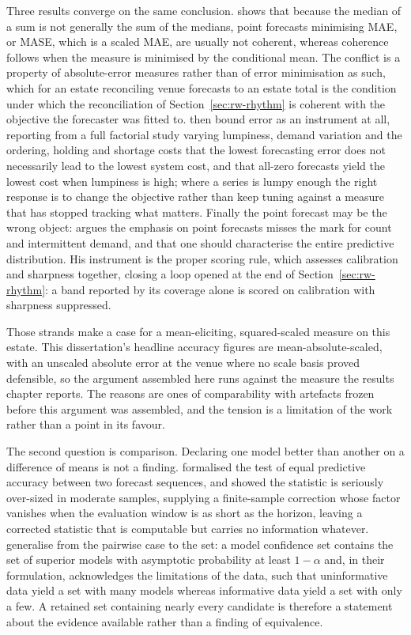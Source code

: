 Three results converge on the same conclusion. \citet{kolassa_we_2023} shows that
because the median of a sum is not generally the sum of the medians, point
forecasts minimising MAE, or MASE, which is a scaled MAE, are usually not
coherent, whereas coherence follows when the measure is minimised by the
conditional mean. The conflict is a property of absolute-error measures rather
than of error minimisation as such, which for an estate reconciling venue
forecasts to an estate total is the condition under which the reconciliation of
Section~\ref{sec:rw-rhythm} is coherent with the objective the forecaster was
fitted to. \citet{chatfield_all-zero_2007} then bound error as an instrument at
all, reporting from a full factorial study varying lumpiness, demand variation
and the ordering, holding and shortage costs that the lowest forecasting error
does not necessarily lead to the lowest system cost, and that all-zero forecasts
yield the lowest cost when lumpiness is high; where a series is lumpy enough the
right response is to change the objective rather than keep tuning against a
measure that has stopped tracking what matters. Finally the point forecast may be
the wrong object: \citet{kolassa_evaluating_2016} argues the emphasis on point
forecasts misses the mark for count and intermittent demand, and that one should
characterise the entire predictive distribution. His instrument is the proper
scoring rule, which assesses calibration and sharpness together, closing a loop
opened at the end of Section~\ref{sec:rw-rhythm}: a band reported by its coverage
alone is scored on calibration with sharpness suppressed.

Those strands make a case for a mean-eliciting, squared-scaled measure on this
estate. This dissertation's headline accuracy figures are mean-absolute-scaled,
with an unscaled absolute error at the venue where no scale basis proved
defensible, so the argument assembled here runs against the measure the results
chapter reports. The reasons are ones of comparability with artefacts frozen
before this argument was assembled, and the tension is a limitation of the work
rather than a point in its favour.

The second question is comparison. Declaring one model better than another on a
difference of means is not a finding.
\citet{diebold_comparing_1995} formalised the test of equal predictive accuracy
between two forecast sequences, and \citet{harvey_testing_1997} showed the
statistic is seriously over-sized in moderate samples, supplying a finite-sample
correction whose factor vanishes when the evaluation window is as short as the
horizon, leaving a corrected statistic that is computable but carries no
information whatever. \citet{hansen_model_2011} generalise from the pairwise case
to the set: a model confidence set contains the set of superior models with
asymptotic probability at least $1 - \alpha$ and, in their formulation,
acknowledges the limitations of the data, such that uninformative data yield a
set with many models whereas informative data yield a set with only a few. A
retained set containing nearly every candidate is therefore a statement about the
evidence available rather than a finding of equivalence.

